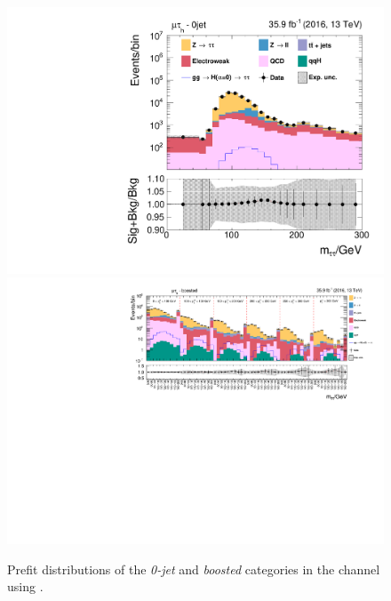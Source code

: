 \begin{figure}[h!]
    \centering
        \includegraphics[width=.5\textwidth]{Figures/statana/Postfit_JEC_jdphi/prefit_htt_mt_1_13TeV.pdf}\\
        \includegraphics[width=\textwidth]{Figures/statana/Postfit_JEC_jdphi/prefit_htt_mt_2_13TeV.pdf}
        \caption{Prefit distributions of the \textit{0-jet} and \textit{boosted} categories in the \mutau{} channel  using \jdphi{}.}
    \end{figure}
